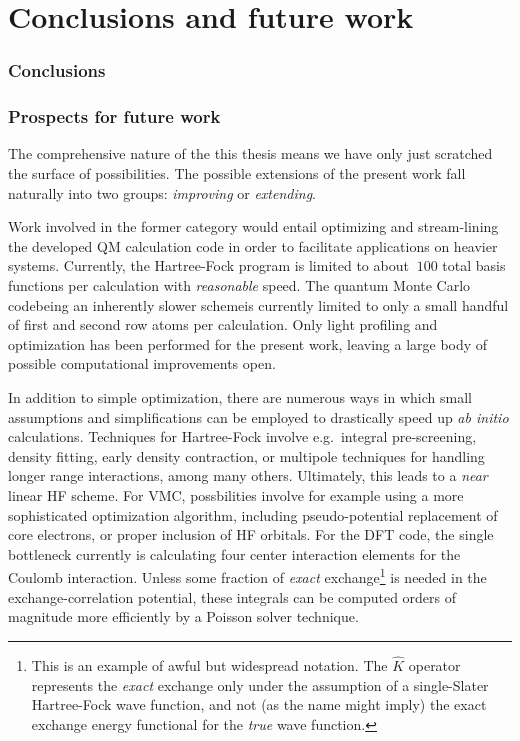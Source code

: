 \documentclass[twoside,english]{uiofysmaster}
\begin{document}
\part{Conclusions and future work}
\section{Conclusions}


\section{Prospects for future work}
The comprehensive nature of the this thesis means we have only just scratched the surface of possibilities. The possible extensions of the present work fall naturally into two groups: \emph{improving} or \emph{extending}. 

Work involved in the former category would entail optimizing and stream-lining the developed QM calculation code in order to facilitate applications on heavier systems. Currently, the Hartree-Fock program is limited to about $~100$ total basis functions per calculation with \emph{reasonable} speed. The quantum Monte Carlo code\textemdash being an inherently slower scheme\textemdash is currently limited to only a small handful of first and second row atoms per calculation. Only light profiling and optimization has been performed for the present work, leaving a large body of possible computational improvements open. 

In addition to simple optimization, there are numerous ways in which small assumptions and simplifications can be employed to drastically speed up \emph{ab initio} calculations. Techniques for Hartree-Fock involve e.g.\ integral pre-screening, density fitting, early density contraction, or multipole techniques for handling longer range interactions, among many others. Ultimately, this leads to a \emph{near} linear HF scheme. For VMC, possbilities involve for example using a more sophisticated optimization algorithm, including pseudo-potential replacement of core electrons, or proper inclusion of HF orbitals. For the DFT code, the single bottleneck currently is calculating four center interaction elements for the Coulomb interaction. Unless some fraction of \emph{exact} exchange\footnote{This is an example of awful but widespread notation. The $\hat K$ operator represents the \emph{exact} exchange only under the assumption of a single-Slater Hartree-Fock wave function, and not (as the name might imply) the exact exchange energy functional for the \emph{true} wave function.} is needed in the exchange-correlation potential, these integrals can be computed orders of magnitude more efficiently by a Poisson solver technique. 
\end{document}
